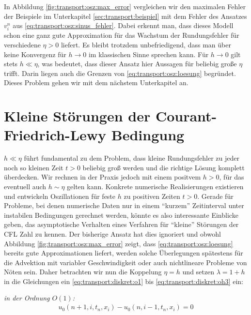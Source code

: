 In Abbildung \ref{fig:transport:osz:max_error} vergleichen wir den maximalen Fehler der Beispiele im Unterkapitel \ref{sec:transport:beispiel} mit dem Fehler des Ansatzes $v^n_i$ aus \eqref{eq:transport:osz:sinus_fehler}.
Dabei erkennt man, dass dieses Modell schon eine ganz gute Approximation für das Wachstum der Rundungsfehler für verschiedene $\eta > 0$ liefert.
Es bleibt trotzdem unbefriedigend, dass man über keine Konvergenz für $h \to 0$ im klassischen Sinne sprechen kann.
Für $h \to 0$ gilt stets $h \ll \eta$, was bedeutet, dass dieser Ansatz hier Aussagen für beliebig große $\eta$ trifft.
Darin liegen auch die Grenzen von \eqref{eq:transport:osz:loesung} begründet.
Dieses Problem gehen wir mit dem nächstem Unterkapitel an.

\section{Kleine Störungen der Courant-Friedrich-Lewy Bedingung}\label{sec:transport:kleineta}

$h \ll \eta$ führt fundamental zu dem Problem, dass kleine Rundungsfehler zu jeder noch so kleinen Zeit $t > 0$ beliebig groß werden und die richtige Lösung komplett überdecken.
Wir rechnen in der Praxis jedoch mit einem positvem $h > 0$, für das eventuell auch $h \sim \eta$ gelten kann.
Konkrete numerische Realisierungen existieren und entwickeln Oszillationen für feste $h$ zu positiven Zeiten $t > 0$.
Gerade für Probleme, bei denen numerische Daten nur in einem ``kurzem'' Zeitinterval unter instabilen Bedingungen gerechnet werden, könnte es also interessante Einblicke geben, das asymptotische Verhalten eines Verfahren für ``kleine'' Störungen der CFL Zahl zu kennen.
Der bisherige Ansatz hat dies ignoriert und obwohl Abbildung \ref{fig:transport:osz:max_error} zeigt, dass \eqref{eq:transport:osz:loesung} bereits gute Approximationen liefert, werden solche Überlegungen spätestens für die Advektion mit variabler Geschwindigkeit oder auch nichtlineare Probleme von Nöten sein.
Daher betrachten wir nun die Koppelung $\eta = h$ und setzen $\lambda = 1 + h$ in die Gleichungen ein \eqref{eq:transport:diskret:o1} bis \eqref{eq:transport:diskret:oh3} ein:

\vspace{0.4cm}
\noindent \emph{in der Ordnung $O(1)$:}
\begin{align}\label{eq:transport:kleineta:o1}
u_0(n+1, i, t_n, x_i) - u_0(n, i-1, t_n, x_i) = 0
\end{align}\\

